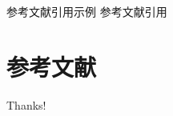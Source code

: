 \documentclass[compress,aspectratio=43,10pt,UTF8]{ctexbeamer}
\begin{document}
\begin{frame}{参考文献引用示例}
    参考文献引用 \cite{knuth92,ConcreteMath,Simpson,Er01,greenwade93}
  \end{frame}

\section{参考文献}

\begin{frame}[allowframebreaks]
    
    
\end{frame}

\begin{frame}
    \begin{center}
        {\Huge\calligra Thanks!}
    \end{center}
\end{frame}
\end{document}
